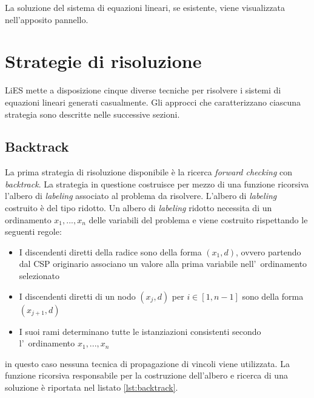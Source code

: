 \documentclass[10pt, a4paper]{article}
\begin{document}
La soluzione del sistema di equazioni lineari, se esistente, viene visualizzata nell'apposito pannello.


\section{Strategie di risoluzione}
\label{sec:strategie}

LiES mette a disposizione cinque diverse tecniche per risolvere i sistemi di equazioni lineari generati casualmente. Gli approcci che caratterizzano ciascuna strategia sono descritte nelle successive sezioni.

\subsection{Backtrack}
\label{sec:backtrack}

La prima strategia di risoluzione disponibile è la ricerca \textit{forward checking} con \textit{backtrack}. La strategia in questione costruisce per mezzo di una funzione ricorsiva l'albero di \textit{labeling} associato al problema da risolvere. L'albero di \textit{labeling} costruito è del tipo ridotto. Un albero di \textit{labeling} ridotto necessita di un ordinamento $x_1, ..., x_n$ delle variabili del problema e viene costruito rispettando le seguenti regole:

\begin{itemize}
	\item I discendenti diretti della radice sono della forma $(x_1, d)$, ovvero partendo dal CSP originario associano un valore alla prima variabile nell'~ordinamento selezionato
	\item I discendenti diretti di un nodo $(x_j, d)$ per $i \in \left [ 1, n-1 \right ]$ sono della forma $(x_{j+1}, d)$
	\item I suoi rami determinano tutte le istanziazioni consistenti secondo l'~ordinamento $x_1, ..., x_n$ 
\end{itemize}

in questo caso nessuna tecnica di propagazione di vincoli viene utilizzata. La funzione ricorsiva responsabile per la costruzione dell'albero e ricerca di una soluzione è riportata nel listato \ref{lst:backtrack}.
\end{document}
